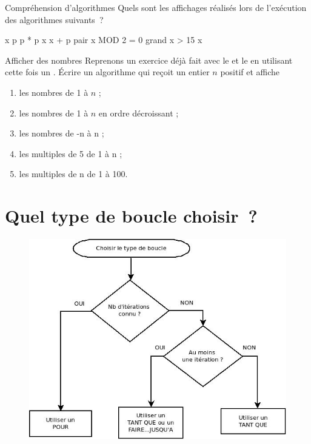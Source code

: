 \clearpage	
		\begin{Exercice}{Compréhension d’algorithmes}
			Quels sont les affichages réalisés lors de l’exécution
			des algorithmes suivants~?

			\begin{LDA}
					\Let x 
					\Let p 
					\Repeat
						\Let p  * p
						\Let x \Gets x + p
						\Let pair \Gets x MOD 2 = 0
						\Let grand \Gets x > 15
					\Write x
				\EndAlgo
			\end{LDA}			
		
		\end{Exercice}

		\begin{Exercice}{Afficher des nombres}
			Reprenons un exercice déjà fait avec le \lda{\algorithmicwhile}
			et le \lda{\algorithmicfor}
			en utilisant cette fois un \lda{\algorithmicuntil}.
			Écrire un algorithme qui reçoit un entier $n$ positif et affiche
			\begin{enumerate}[label=\alph*)]
			\item les nombres de 1 à $n$ ;
			\item les nombres de 1 à $n$ en ordre décroissant ;
			\item les nombres de -n à n ;
			\item les multiples de 5 de 1 à n ;
			\item les multiples de n de 1 à 100.
			\end{enumerate}
		\end{Exercice}

\section{Quel type de boucle choisir~?}

		\begin{figure}
		\includegraphics[width=.6\textwidth]{image/boucle-choixtype}
				\label{fig:boucle-choix}
		\end{figure}

